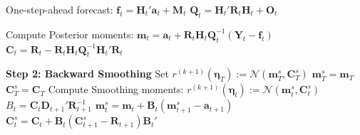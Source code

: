 \documentclass[APA,STIX1COL]{WileyNJD-v2}
\begin{document}
\begin{algorithm}
\begin{algorithmic}
    \State One-step-ahead forecast:
    \State $\mathbf{f}_t = \mathbf{H}_t'\mathbf{a}_t + \mathbf{M}_t$
    \State $\mathbf{Q}_t = \mathbf{H}_t'\mathbf{R}_t\mathbf{H}_t + \mathbf{O}_t$

    \State Compute Posterior moments:
    \State $\mathbf{m}_t = \mathbf{a}_t + \mathbf{R}_t \mathbf{H}_t \mathbf{Q}_t^{-1}(\mathbf{Y}_t - \mathbf{f}_t)$
    \State $\mathbf{C}_t = \mathbf{R}_t - \mathbf{R}_t \mathbf{H}_t \mathbf{Q}_t^{-1} \mathbf{H}_t' \mathbf{R}_t$
\EndFor

\State \textbf{Step 2: Backward Smoothing}
        \State Set $r^{(k+1)}(\boldsymbol{\eta}_T) := \mathcal{N}(\mathbf{m}_T^s, \mathbf{C}_T^s)$
        \State $\mathbf{m}_T^s = \mathbf{m}_T$
        \State $\mathbf{C}_T^s = \mathbf{C}_T$
    \Else
        \State Compute Smoothing moments:
        \State $r^{(k+1)}(\boldsymbol{\eta}_t) := \mathcal{N}(\mathbf{m}_t^s, \mathbf{C}_t^s)$
        \State $B_t = \mathbf{C}_t \mathbf{D}_{t+1}' \mathbf{R}_{t+1}^{-1}$
        \State $\mathbf{m}_t^s = \mathbf{m}_t + \mathbf{B}_t (\mathbf{m}_{t+1}^s - \mathbf{a}_{t+1})$
        \State $\mathbf{C}_t^s = \mathbf{C}_t + \mathbf{B}_t (\mathbf{C}_{t+1}^s - \mathbf{R}_{t+1}) \mathbf{B}_t'$
    \EndIf
\EndFor


\end{algorithmic}
\end{algorithm}


\clearpage

%

\end{document}
